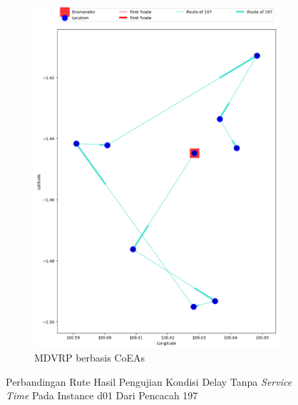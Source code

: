 \begin{figure}[H]
	\centering
	\begin{subfigure}[t]{\textwidth}
		\centering
		\includegraphics[width=\textwidth]{Resources/Images/delayed_1/real_m15_n100_delayed_1_197_coes}
		\caption{MDVRP berbasis CoEAs}
		\label{fig:real_m15_n100_delayed_1_197_coes}
	\end{subfigure}
	\caption{Perbandingan Rute Hasil Pengujian Kondisi Delay Tanpa \textit{Service Time} Pada Instance d01 Dari Pencacah 197}
	\label{fig:real_m15_n100_delayed_1_197}
\end{figure}


